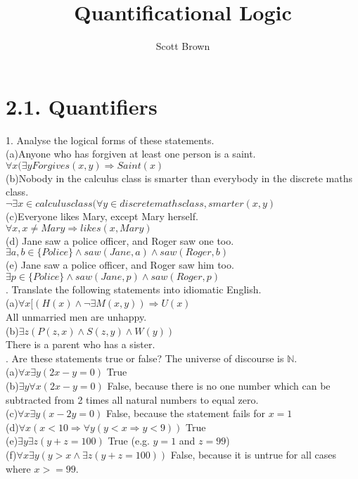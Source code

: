 \documentclass{article}
\begin{document}
\title{Quantificational Logic}
\author{Scott Brown}
\maketitle
\section*{2.1. Quantifiers}
1. Analyse the logical forms of these statements.\\
(a)Anyone who has forgiven at least one person is a saint.\\
$\forall x(\exists y Forgives(x,y) \Rightarrow Saint(x) $\\
(b)Nobody in the calculus class is smarter than everybody in the discrete maths class.\\
$\neg \exists x \in calculus class (\forall y \in discrete maths class, smarter(x,y)$\\
(c)Everyone likes Mary, except Mary herself.\\
$\forall x, x \not = Mary \Rightarrow likes(x, Mary)$\\
(d) Jane saw a police officer, and Roger saw one too.\\
$\exists a,b \in \{Police\} \wedge saw(Jane,a) \wedge saw(Roger,b)$\\
(e) Jane saw a police officer, and Roger saw him too.\\
$\exists p \in \{Police\} \wedge saw(Jane,p) \wedge saw(Roger, p)$\\
. Translate the following statements into idiomatic English.\\
(a)$\forall x[(H(x) \wedge \neg \exists M(x,y)) \Rightarrow U(x)$\\
All unmarried men are unhappy.\\
(b)$\exists z(P(z,x) \wedge S(z,y) \wedge W(y))$\\
There is a parent who has a sister.\\
. Are these statements true or false? The universe of discourse is $\mathbb{N}$.\\
(a)$\forall x \exists y(2x - y = 0)$ True\\
(b)$\exists y \forall x(2x - y = 0)$ False, because there is no one number which can be subtracted from 2 times all natural numbers to equal zero.\\
(c)$\forall x \exists y (x - 2y = 0)$ False, because the statement fails for $x = 1$\\
(d)$\forall x(x < 10 \Rightarrow \forall y(y < x \Rightarrow y < 9))$ True\\
(e)$\exists y \exists z(y + z = 100)$ True (e.g. $y = 1$ and $z = 99$)\\
(f)$\forall x \exists y(y > x \wedge \exists z(y + z = 100))$ False, because it is untrue for all cases where $x >= 99$.\\
\end{document}

